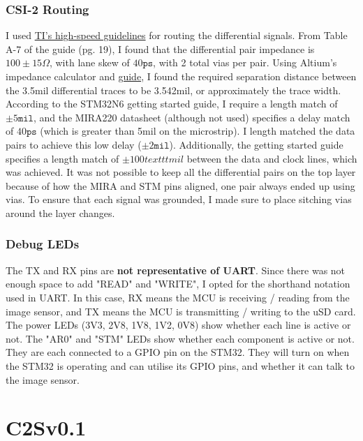 \documentclass[10pt]{article}
\newcommand{\nl}{\newline \newline}
\begin{document}
\subsubsection{CSI-2 Routing}
I used \href{https://www.ti.com/lit/an/spraar7j/spraar7j.pdf?ts=1755945140120}{TI's high-speed guidelines} for routing the differential signals.
From Table A-7 of the guide (pg. 19), I found that the differential pair impedance is $100\pm15\Omega$, with lane skew of $40\texttt{ps}$, with 2 total vias per pair.
Using Altium's impedance calculator and \href{https://files.resources.altium.com/sites/default/files/2020-03/Impedance%20Calculation_fin2.pdf}{guide}, I found the required separation distance between the 3.5mil differential traces to be 3.542mil, or approximately the trace width.
According to the STM32N6 getting started guide, I require a length match of $\pm5\texttt{mil}$, and the MIRA220 datasheet (although not used) specifies a delay match of $40\texttt{ps}$ (which is greater than 5mil on the microstrip). I length matched the data pairs to achieve this low delay ($\pm2\texttt{mil}$).
Additionally, the getting started guide specifies a length match of $\pm100texttt{mil}$ between the data and clock lines, which was achieved.
\nl
It was not possible to keep all the differential pairs on the top layer because of how the MIRA and STM pins aligned, one pair always ended up using vias. To ensure that each signal was grounded, I made sure to place sitching vias around the layer changes.

\subsubsection{Debug LEDs}
The TX and RX pins are \textbf{not representative of UART}. Since there was not enough space to add "READ" and "WRITE", I opted for the shorthand notation used in UART. In this case, RX means the MCU is receiving / reading from the image sensor, and TX means the MCU is transmitting / writing to the uSD card.
\nl
The power LEDs (3V3, 2V8, 1V8, 1V2, 0V8) show whether each line is active or not.
\nl
The "AR0" and "STM" LEDs show whether each component is active or not. They are each connected to a GPIO pin on the STM32. They will turn on when the STM32 is operating and can utilise its GPIO pins, and whether it can talk to the image sensor.

\newpage \section{C2Sv0.1}
\end{document}
